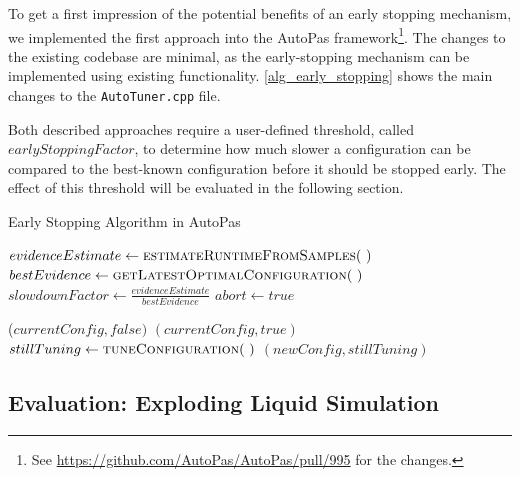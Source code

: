 \documentclass[conference]{IEEEtran}
\begin{document}
To get a first impression of the potential benefits of an early stopping mechanism, we implemented the first approach into the AutoPas framework\footnote{
    See \href{https://github.com/AutoPas/AutoPas/pull/995}{
        https://github.com/AutoPas/AutoPas/pull/995} for the changes.
}. The changes to the existing codebase are minimal, as the early-stopping mechanism can be implemented using existing functionality. \autoref{alg_early_stopping} shows the main changes to the \texttt{AutoTuner.cpp} file.

Both described approaches require a user-defined threshold, called $earlyStoppingFactor$, to determine how much slower a configuration can be compared to the best-known configuration before it should be stopped early. The effect of this threshold will be evaluated in the following section.

\begin{algorithm}[h]
    \small
    \caption{Early Stopping Algorithm in AutoPas}
    \label{alg_early_stopping}
    \begin{algorithmic}[1]
        \State \Return
        \EndIf
        \State $evidenceEstimate \gets \Call{estimateRuntimeFromSamples}{~}$
        \State $bestEvidence \gets \Call{getLatestOptimalConfiguration}{~}$
        \State $slowdownFactor \gets \frac{evidenceEstimate}{bestEvidence}$
        \State $abort \gets true$
        \EndIf
        \EndProcedure

        \vspace{0.2em}

        \State \Return ($currentConfig, false)$
            \State \Return $(currentConfig, true)$
            \Else
            \State $stillTuning \gets \Call{tuneConfiguration}{~}$
            \State \Return $(newConfig, stillTuning)$
        \EndIf
        \EndProcedure
    \end{algorithmic}
\end{algorithm}

\subsection{Evaluation: Exploding Liquid Simulation}
\label{sec:evaluation}
\end{document}
